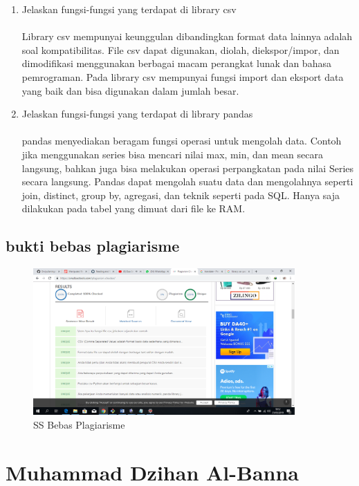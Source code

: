 \begin{enumerate}
\item Jelaskan fungsi-fungsi yang terdapat di library csv
\paragraph{} Library csv mempunyai keunggulan dibandingkan format data lainnya adalah soal kompatibilitas. File csv dapat digunakan, diolah, diekspor/impor, dan dimodifikasi menggunakan berbagai macam perangkat lunak dan bahasa pemrograman. Pada library csv mempunyai fungsi import dan eksport data yang baik dan bisa digunakan dalam jumlah besar.

\item Jelaskan fungsi-fungsi yang terdapat di library pandas
\paragraph{} pandas menyediakan beragam fungsi operasi untuk mengolah data. Contoh jika menggunakan series bisa mencari nilai max, min, dan mean secara langsung, bahkan juga bisa melakukan operasi perpangkatan pada nilai Series secara langsung.
Pandas dapat mengolah suatu data dan mengolahnya seperti join, distinct, group by, agregasi, dan teknik seperti pada SQL. Hanya saja dilakukan pada tabel yang dimuat dari file ke RAM.
\end{enumerate}

\subsection{bukti bebas plagiarisme}
\begin{figure}[H]
\centering
\includegraphics[width=10cm]{figures/yuli.png}
\caption{SS Bebas Plagiarisme}
\label{dwiyul}
\end{figure}

\section{Muhammad Dzihan Al-Banna}
